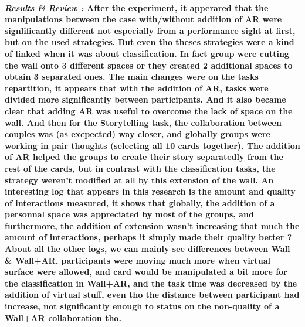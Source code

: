 \documentclass{article}
\begin{document}
    \paragraph{ \textit{Results \& Review :} 
                \newline
                \indent \indent \textnormal{After the experiment, it apperared that the manipulations between the case with/without addition of AR were signlificantly different
                not especially from a performance sight at first, but on the used strategies. But even tho theses strategies were a kind of linked when it was about classification. 
                In fact group were cutting the wall onto 3 different spaces or they created 2 additional spaces to obtain 3 separated ones. The main changes were on the tasks repartition,
                it appears that with the addition of AR, tasks were divided more significantly between participants. And it also became clear that adding AR was useful to overcome the lack 
                of space on the wall.}
                \newline
                \indent \indent \textnormal{And then for the Storytelling task, the collaboration between couples was (as excpected) way closer, and globally groups were working
                in pair thoughts (selecting all 10 cards together). The addition of AR helped the groups to create their story separatedly from the rest of the cards, but in contrast with 
                the classification tasks, the strategy weren't modified at all by this extension of the wall.}
                \newline
                \indent \indent \textnormal{An interesting log that appears in this research is the amount and quality of interactions measured, it shows that globally, the addition of a 
                personnal space was appreciated by most of the groups, and furthermore, the addition of extension wasn't increasing that much the amount of interactions, perhaps it simply made
                their quality better ?}
                \newline
                \indent \indent \textnormal{About all the other logs, we can mainly see differences between Wall \& Wall+AR, participants were moving much more when virtual surface were allowed,
                and card would be manipulated a bit more for the classification in Wall+AR, and the task time was decreased by the addition of virtual stuff, even tho the distance between participant
                had increase, not significantly enough to status on the non-quality of a Wall+AR collaboration tho.} }
\end{document}
